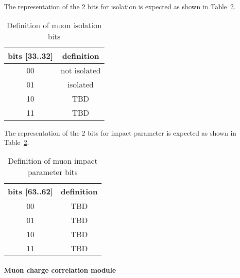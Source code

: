 The representation of the 2 bits for isolation is expected as shown in Table~\ref{tab:gtl:muon_iso_bits}.\\
 
\begin{table}[ht]
\caption{Definition of muon isolation bits}
\vspace{5mm}
\centering
\begin{tabular}{|c|c|}\hline
bits [33..32] & definition \\\hline\hline
00 & not isolated \\
01 & isolated \\
10 & TBD \\
11 & TBD \\\hline
\end{tabular}
\label{tab:gtl:muon_iso_bits}
\end{table}

The representation of the 2 bits for impact parameter is expected as shown in Table~\ref{tab:gtl:muon_iso_bits}.\\
 
\begin{table}[ht]
\caption{Definition of muon impact parameter bits}
\vspace{5mm}
\centering
\begin{tabular}{|c|c|}\hline
bits [63..62] & definition \\\hline\hline
00 & TBD \\
01 & TBD \\
10 & TBD \\
11 & TBD \\\hline
\end{tabular}
\label{tab:gtl:muon_iso_bits}
\end{table}

\clearpage

\paragraph{Muon charge correlation module}
\label{sec:gtl:muon_charge_correlation_module}

